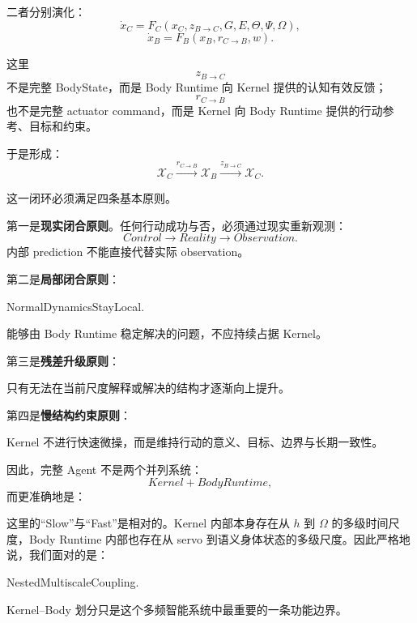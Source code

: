 二者分别演化：
\[
\dot x_C
=
F_C
\left(
x_C,
z_{B\rightarrow C},
G,
E,
\Theta,
\Psi,
\Omega
\right),
\]
\[
\dot x_B
=
F_B
\left(
x_B,
r_{C\rightarrow B},
w
\right).
\]

这里
\[
z_{B\rightarrow C}
\]
不是完整 BodyState，而是 Body Runtime 向 Kernel 提供的认知有效反馈；
\[
r_{C\rightarrow B}
\]
也不是完整 actuator command，而是 Kernel 向 Body Runtime 提供的行动参考、目标和约束。

于是形成：
\[
\boxed{
\mathcal X_C
\xrightarrow{r_{C\rightarrow B}}
\mathcal X_B
\xrightarrow{z_{B\rightarrow C}}
\mathcal X_C.
}
\]

这一闭环必须满足四条基本原则。

第一是\textbf{现实闭合原则}。任何行动成功与否，必须通过现实重新观测：
\[
Control
\rightarrow
Reality
\rightarrow
Observation.
\]
内部 prediction 不能直接代替实际 observation。

第二是\textbf{局部闭合原则}：
\begin{statementbox}
NormalDynamicsStayLocal.
\end{statementbox}
能够由 Body Runtime 稳定解决的问题，不应持续占据 Kernel。

第三是\textbf{残差升级原则}：
\begin{statementbox}
\centering
{}
\end{statementbox}
只有无法在当前尺度解释或解决的结构才逐渐向上提升。

第四是\textbf{慢结构约束原则}：
\begin{statementbox}
\centering
{}
\end{statementbox}
Kernel 不进行快速微操，而是维持行动的意义、目标、边界与长期一致性。

因此，完整 Agent 不是两个并列系统：
\[
Kernel+BodyRuntime,
\]
而更准确地是：
\begin{statementbox}
\centering
{}
\end{statementbox}

这里的“Slow”与“Fast”是相对的。Kernel 内部本身存在从 $h$ 到 $\Omega$ 的多级时间尺度，Body Runtime 内部也存在从 servo 到语义身体状态的多级尺度。因此严格地说，我们面对的是：
\begin{statementbox}
NestedMultiscaleCoupling.
\end{statementbox}
Kernel--Body 划分只是这个多频智能系统中最重要的一条功能边界。

